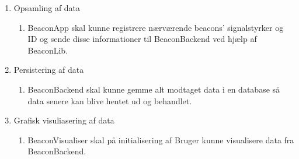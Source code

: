 \begin{enumerate}
	\item Opsamling af data
		\begin{enumerate}
			\item BeaconApp skal kunne registrere nærværende beacons' signalstyrker og ID og sende disse informationer til BeaconBackend ved hjælp af BeaconLib.
		\end{enumerate}
		
	\item Persistering af data
		\begin{enumerate}
			\item BeaconBackend skal kunne gemme alt modtaget data i en database så data senere kan blive hentet ud og behandlet.
		\end{enumerate}
		
	\item Grafisk visuliasering af data
	\begin{enumerate}
		\item BeaconVisualiser skal på initialisering af Bruger kunne visualisere data  fra BeaconBackend.
	\end{enumerate}		
\end{enumerate}
